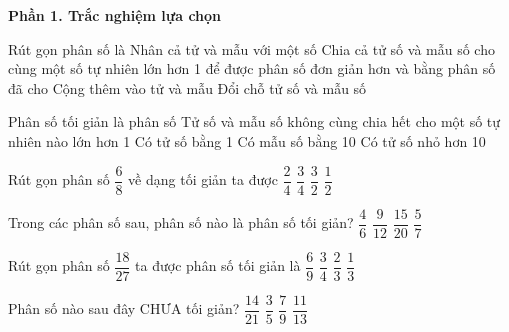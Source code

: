 \textbf{Phần 1. Trắc nghiệm lựa chọn}

\begin{ex} %
Rút gọn phân số là
\choice
{Nhân cả tử và mẫu với một số}
{\True Chia cả tử số và mẫu số cho cùng một số tự nhiên lớn hơn 1 để được phân số đơn giản hơn và bằng phân số đã cho}
{Cộng thêm vào tử và mẫu}
{Đổi chỗ tử số và mẫu số}
\end{ex}

\begin{ex} %
Phân số tối giản là phân số
\choice
{\True Tử số và mẫu số không cùng chia hết cho một số tự nhiên nào lớn hơn 1}
{Có tử số bằng 1}
{Có mẫu số bằng 10}
{Có tử số nhỏ hơn 10}
\end{ex}

\begin{ex} %
Rút gọn phân số $\dfrac{6}{8}$ về dạng tối giản ta được
\choice
{$\dfrac{2}{4}$}
{\True $\dfrac{3}{4}$}
{$\dfrac{3}{2}$}
{$\dfrac{1}{2}$}
\end{ex}

\begin{ex} %
Trong các phân số sau, phân số nào là phân số tối giản?
\choice
{$\dfrac{4}{6}$}
{$\dfrac{9}{12}$}
{$\dfrac{15}{20}$}
{\True $\dfrac{5}{7}$}
\end{ex}

\begin{ex} %
Rút gọn phân số $\dfrac{18}{27}$ ta được phân số tối giản là
\choice
{$\dfrac{6}{9}$}
{$\dfrac{3}{4}$}
{\True $\dfrac{2}{3}$}
{$\dfrac{1}{3}$}
\end{ex}

\begin{ex} %
Phân số nào sau đây CHƯA tối giản?
\choice
{\True $\dfrac{14}{21}$}
{$\dfrac{3}{5}$}
{$\dfrac{7}{9}$}
{$\dfrac{11}{13}$}
\end{ex}

